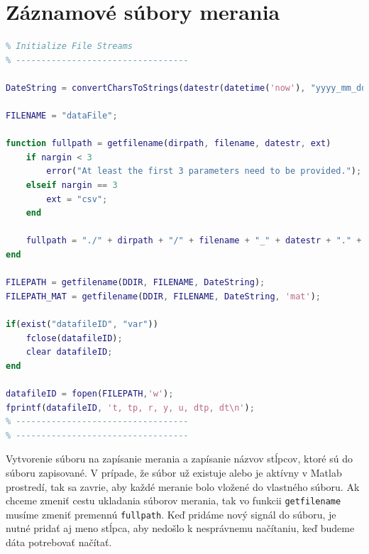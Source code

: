 \documentclass[a4paper, 10pt, ]{article}
\begin{document}
\section{Záznamové súbory merania}
\begin{lstlisting}[caption=Inicializácia záznamových súborov., label={code:files}, language=Matlab]
% ----------------------------------
% Initialize File Streams
% ----------------------------------

DateString = convertCharsToStrings(datestr(datetime('now'), "yyyy_mm_dd_HH_MM_ss"));

FILENAME = "dataFile";

function fullpath = getfilename(dirpath, filename, datestr, ext)
    if nargin < 3
        error("At least the first 3 parameters need to be provided.");
    elseif nargin == 3
        ext = "csv";
    end

    fullpath = "./" + dirpath + "/" + filename + "_" + datestr + "." + ext;
end

FILEPATH = getfilename(DDIR, FILENAME, DateString);
FILEPATH_MAT = getfilename(DDIR, FILENAME, DateString, 'mat');

if(exist("datafileID", "var"))
    fclose(datafileID);
    clear datafileID;
end

datafileID = fopen(FILEPATH,'w');
fprintf(datafileID, 't, tp, r, y, u, dtp, dt\n');
% ----------------------------------
% ----------------------------------
\end{lstlisting}

Vytvorenie súboru na zapísanie merania a zapísanie názvov stĺpcov, ktoré sú do súboru zapisované. V prípade, že súbor už existuje alebo je aktívny v Matlab prostredí, tak sa zavrie, aby každé meranie bolo vložené do vlastného súboru. Ak chceme zmeniť cestu ukladania súborov merania, tak vo funkcii \texttt{getfilename} musíme zmeniť premennú \texttt{fullpath}. Keď pridáme nový signál do súboru, je nutné pridať aj meno stĺpca, aby nedošlo k nesprávnemu načítaniu, keď budeme dáta potrebovať načítať.
\end{document}
